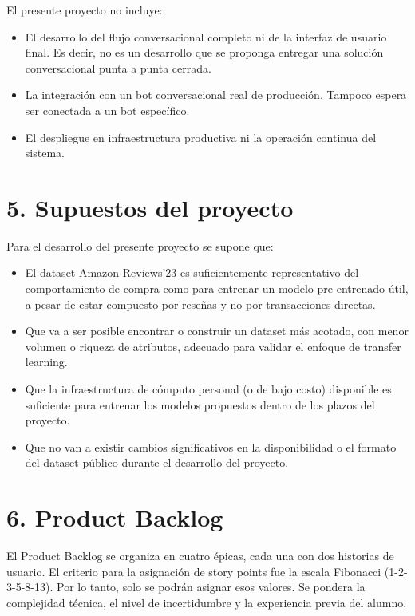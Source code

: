 \documentclass[
11pt, %
]{charter}
\begin{document}
El presente proyecto no incluye:
\begin{itemize}
	\item El desarrollo del flujo conversacional completo ni de la interfaz de usuario final. Es decir, no es un desarrollo que se proponga entregar una solución conversacional punta a punta cerrada.
	\item La integración con un bot conversacional real de producción. Tampoco espera ser conectada a un bot específico.
	\item El despliegue en infraestructura productiva ni la operación continua del sistema.
\end{itemize}


\section{5. Supuestos del proyecto}
\label{sec:supuestos}

Para el desarrollo del presente proyecto se supone que:

\begin{itemize}
	\item El dataset Amazon Reviews'23 es suficientemente representativo del comportamiento de compra como para entrenar un modelo pre entrenado útil, a pesar de estar compuesto por reseñas y no por transacciones directas.
	\item Que va a ser posible encontrar o construir un dataset más acotado, con menor volumen o riqueza de atributos, adecuado para validar el enfoque de transfer learning.
	\item Que la infraestructura de cómputo personal (o de bajo costo) disponible es suficiente para entrenar los modelos propuestos dentro de los plazos del proyecto.
	\item Que no van a existir cambios significativos en la disponibilidad o el formato del dataset público durante el desarrollo del proyecto.
\end{itemize}

\section{6. Product Backlog}
\label{sec:backlog}

El Product Backlog se organiza en cuatro \'{e}picas, cada una con dos historias de usuario. El criterio para la asignación de story points fue la escala Fibonacci (1-2-3-5-8-13). Por lo tanto, solo se podrán asignar esos valores. Se pondera la complejidad técnica, el nivel de incertidumbre y la experiencia previa del alumno.
\end{document}
